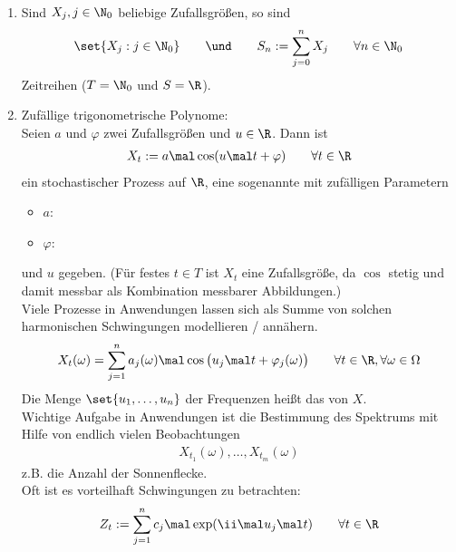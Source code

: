 \begin{beispiel}\label{beisp1.3.3}\
	\begin{enumerate}[label=(\alph*)]
		\item Sind $X_j,j\in\N_0$ beliebige Zufallsgrößen, so sind 
		\begin{align*}
			\set{X_j:j\in\N_0}
			\qquad\und\qquad
			S_n:=\sum\limits_{j=0}^n X_j\qquad\forall n\in\N_0
		\end{align*}
		Zeitreihen ($T=\N_0$ und $S=\R$).
		\item Zufällige trigonometrische Polynome:\label{beisp:1.3.3(b)}\\
		Seien $a$ und $\varphi$ zwei Zufallsgrößen und $u\in\R$.
		Dann ist 
		\begin{align*}
			X_t:=a\mal\cos(u\mal t+\varphi)\qquad\forall t\in\R
		\end{align*}
		ein stochastischer Prozess auf $\R$, eine sogenannte  mit zufälligen Parametern
		\begin{itemize}
			\item $a$: 
			\item $\varphi$: 
		\end{itemize}
		und  $u$ gegeben.
		(Für festes $t\in T$ ist $X_t$ eine Zufallsgröße, da $\cos$ stetig und damit messbar als Kombination messbarer Abbildungen.)\\
		Viele Prozesse in Anwendungen lassen sich als Summe von solchen harmonischen Schwingungen modellieren / annähern.
		\begin{align*}
			X_t(\omega)=\sum\limits_{j=1}^n a_j(\omega)\mal\cos\big(u_j\mal t+\varphi_j(\omega)\big)\qquad\forall t\in\R,\forall\omega\in\Omega
		\end{align*}
		Die Menge $\set{u_1,\ldots,u_n}$ der Frequenzen heißt das  von $X$. \\
		Wichtige Aufgabe in Anwendungen ist die Bestimmung des Spektrums mit Hilfe von endlich vielen Beobachtungen 
		\begin{align*}
			X_{t_1}(\omega),\ldots,X_{t_m}(\omega)
		\end{align*}
		z.B. die Anzahl der Sonnenflecke.\\
		Oft ist es vorteilhaft  Schwingungen zu betrachten:
		\begin{align*}%
			Z_t:=\sum\limits_{j=1}^n c_j\mal\exp(\ii\mal u_j\mal t)\qquad\forall t\in\R

\end{align*}
\end{enumerate}
\end{beispiel}
